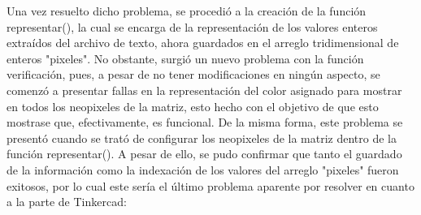 \documentclass{article}
\begin{document}
Una vez resuelto dicho problema, se procedió a la creación de la función representar(), la cual se encarga de la representación de los valores enteros extraídos del archivo de texto, ahora guardados en el arreglo tridimensional de enteros "pixeles". No obstante, surgió un nuevo problema con la función verificación, pues, a pesar de no tener modificaciones en ningún aspecto, se comenzó a presentar fallas en la representación del color asignado para mostrar en todos los neopixeles de la matriz, esto hecho con el objetivo de que esto mostrase que, efectivamente, es funcional. De la misma forma, este problema se presentó cuando se trató de configurar los neopixeles de la matriz dentro de la función representar(). A pesar de ello, se pudo confirmar que tanto el guardado de la información como la indexación de los valores del arreglo "pixeles" fueron exitosos, por lo cual este sería el último problema aparente por resolver en cuanto a la parte de Tinkercad:
\end{document}
